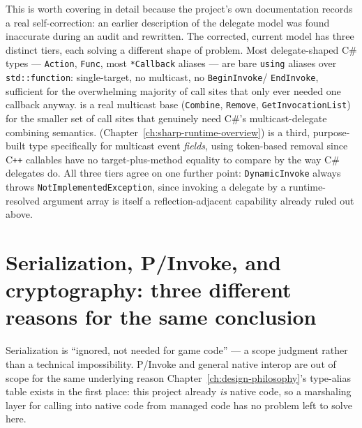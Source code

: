 This is worth covering in detail because the project's own documentation records a real
self-correction: an earlier description of the delegate model was found inaccurate during an
audit and rewritten. The corrected, current model has three distinct tiers, each solving a
different shape of problem. Most delegate-shaped C\# types --- \texttt{Action},
\texttt{Func}, most \texttt{*Callback} aliases --- are bare \texttt{using} aliases over
\texttt{std::function}: single-target, no multicast, no \texttt{BeginInvoke}/%
\texttt{EndInvoke}, sufficient for the overwhelming majority of call sites that only ever
needed one callback anyway.  is a real multicast base
(\texttt{Combine}, \texttt{Remove}, \texttt{GetInvocationList}) for the smaller set of call
sites that genuinely need C\#'s multicast-delegate combining semantics.
 (Chapter~\ref{ch:sharp-runtime-overview}) is a
third, purpose-built type specifically for multicast event \emph{fields}, using
token-based removal since C\texttt{++} callables have no target-plus-method equality to
compare by the way C\# delegates do. All three tiers agree on one further point:
\texttt{DynamicInvoke} always throws \texttt{NotImplementedException}, since invoking a
delegate by a runtime-resolved argument array is itself a reflection-adjacent capability
already ruled out above.

\section{Serialization, P/Invoke, and cryptography: three different reasons for the same conclusion}

Serialization is ``ignored, not needed for game code'' --- a scope judgment rather than a
technical impossibility. P/Invoke and general native interop are out of scope for the same
underlying reason Chapter~\ref{ch:design-philosophy}'s type-alias table exists in the first
place: this project already \emph{is} native code, so a marshaling layer for calling into
native code from managed code has no problem left to solve here.

